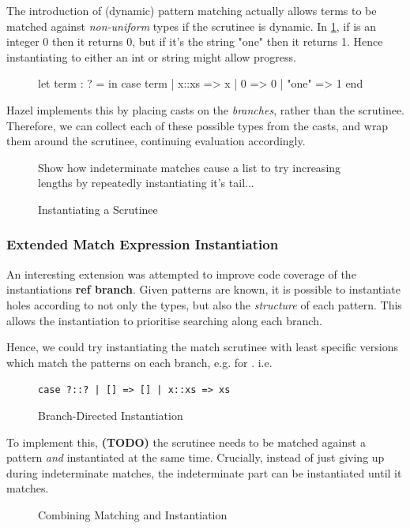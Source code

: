 The introduction of (dynamic) pattern matching actually allows terms to be matched against \textit{non-uniform} types if the scrutinee is dynamic. In \cref{fig:DynamicPatternMatching}, if  is an integer 0 then it returns 0, but if it's the string "one" then it returns 1. Hence instantiating  to either an int or string might allow progress.

\begin{figure}[h]
let term : ? =   in
case term 
  | x::xs => x
  | 0 => 0
| "one" => 1 end 
\label{fig:DynamicPatternMatching}
\end{figure}

Hazel implements this by placing casts on the \textit{branches}, rather than the scrutinee. Therefore, we can collect each of these possible types from the casts, and wrap them around the scrutinee, continuing evaluation accordingly.


\begin{figure}
Show how indeterminate matches cause a list to try increasing lengths by repeatedly instantiating it's tail...
\caption{Instantiating a Scrutinee}
\end{figure}

\subsubsection{Extended Match Expression Instantiation}
\label{sec:ExtendedPatternMatching}
An interesting extension was attempted to improve code coverage of the instantiations \textbf{ref branch}. Given patterns are known, it is possible to instantiate holes according to not only the types, but also the \textit{structure} of each pattern. This allows the instantiation to prioritise searching along each branch.

Hence, we could try instantiating the match scrutinee with least specific versions which match the patterns on each branch, e.g.  for . i.e. 

\begin{figure}[H]
\texttt{case ?::? | [] => [] | x::xs => xs}
\caption{Branch-Directed Instantiation}
\end{figure}

To implement this, \textbf{(TODO)} the scrutinee needs to be matched against a pattern \textit{and} instantiated at the same time. Crucially, instead of just giving up during indeterminate matches, the indeterminate part can be instantiated until it matches.

\begin{figure}[H]
\caption{Combining Matching and Instantiation}
\end{figure}


